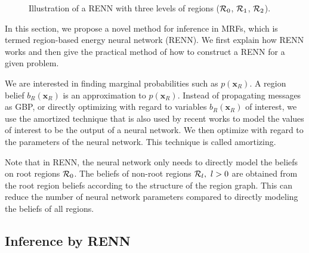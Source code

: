 \begin{figure}[!t]
  
  \caption{Illustration of a RENN with three levels of regions ($\mathcal{R}_0$, $\mathcal{R}_1$, $\mathcal{R}_2$).}
  \label{fig:renn-illustration}
  
\end{figure}


In this section, we propose a novel method for inference in MRFs, which is termed region-based energy neural network (RENN). We first explain how RENN works and then give the practical method of how to construct a RENN for a given problem.

We are interested in finding marginal probabilities such as $p(\bm{x}_R)$. A region belief $b_R(\bm{x}_R)$ is an approximation to $p(\bm{x}_R)$.
Instead of propagating messages as GBP, or directly optimizing with regard to variables ${b_R(\bm{x}_R)}$ of interest, we use the amortized technique that is also used by recent works \cite{DBLP:journals/corr/KingmaW13, srikumar-etal-2012-amortizing, NIPS2019_9687, akbayrak2019reparameterization} to model the values of interest to be the output of a neural network. We then optimize with regard to the parameters of the neural network. This technique is called amortizing.

Note that in RENN, the neural network only needs to directly model the beliefs on root regions $\mathcal{R}_0$. The beliefs of non-root regions $\mathcal{R}_l,~l>0$ are obtained from the root region beliefs according to the structure of the region graph. This can reduce the number of neural network parameters compared to directly modeling the beliefs of all regions.

\subsection{Inference by RENN}
\label{sec:infer-renn}

